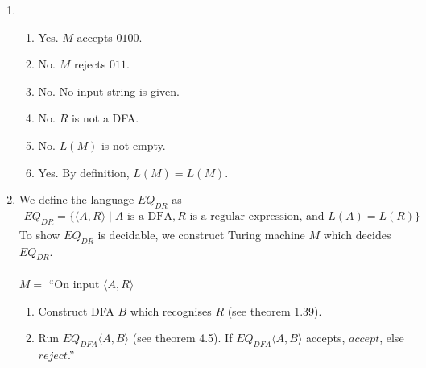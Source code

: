 \documentclass[11pt]{article}
\begin{document}
\begin{enumerate}[4.1]
  \item
  \begin{enumerate}
    \item Yes. $M$ accepts $0100$.
    \item No. $M$ rejects $011$.
    \item No. No input string is given.
    \item No. $R$ is not a DFA.
    \item No. $L(M)$ is not empty.
    \item Yes. By definition, $L(M) = L(M)$.
  \end{enumerate}
  \item We define the language $EQ_{DR}$ as
    \begin{align*}
      EQ_{DR} = \{ \langle A, R \rangle \mid A \text{ is a DFA}, R \text{ is a regular expression, and } L(A) = L(R) \}
    \end{align*}
    To show $EQ_{DR}$ is decidable, we construct Turing machine $M$ which decides $EQ_{DR}$. \\\\
    $M =$ ``On input $\langle A, R \rangle$
    \begin{enumerate}[label=\arabic*.]
      \item Construct DFA $B$ which recognises $R$ (see theorem 1.39).
      \item Run $EQ_{DFA}\langle A, B \rangle$ (see theorem 4.5). If $EQ_{DFA}\langle A, B \rangle$ accepts, $accept$, else $reject$.''
    \end{enumerate}
\end{enumerate}
\end{document}
